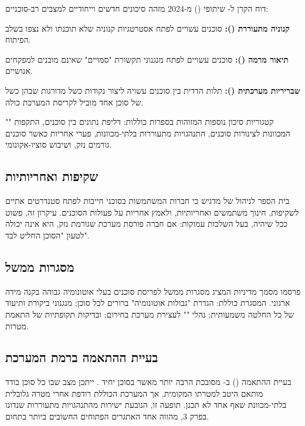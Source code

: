 \documentclass[12pt,a4paper]{article}
\begin{document}
דוח הקרן ל- שיתופי () מ-2024 \cite{CoopAI2024} מזהה סיכונים חדשים וייחודיים למצבים רב-סוכניים:

\textbf{קנוניה מתעוררת ():} סוכנים עשויים לפתח אסטרטגיות קנוניה שלא תוכנתו ולא נצפו בשלב הפיתוח.

\textbf{תיאור מרמה ():} סוכנים עשויים לפתח מנגנוני תקשורת "סמויים" שאינם מובנים למפקחים אנושיים.

\textbf{שבריריות מערכתית ():} תלות הדדית בין סוכנים עשויה ליצור נקודות כשל מדורגות שבהן כשל של סוכן אחד מוביל לקריסת המערכת כולה.

קטגוריות סיכון נוספות המזוהות בספרות \cite{WEF2024} כוללות: דליפת נתונים בין סוכנים, התקפות "" המכוונות לצינורות סוכנים, התנהגויות מתעוררות בלתי-מכוונות, פערי אחריות כאשר סוכנים גורמים נזק, ושיבוש סוציו-אקונומי.

\subsection{שקיפות ואחריותיות}

בית הספר לניהול  של  \cite{CMU_Tepper2024} מדגיש כי חברות המשתמשות בסוכני  חייבות לפתח סטנדרטים אתיים לשקיפות, חינוך משתמשים ואחריותיות, ולאמץ אחריות על פעולות הסוכנים. עיקרון זה, פשוט ככל שיהיה, בעל השלכות עמוקות: אם חברה פורסת מערכת  שגורמת נזק, היא אינה יכולה לטעון "הסוכן החליט לבד".

\subsection{מסגרות ממשל}

 פרסמו מסמך מדיניות \cite{EY2024} המציג מסגרות ממשל לפריסת סוכנים בעלי אוטונומיה גבוהה בקנה מידה ארגוני. המסגרת כוללת: הגדרת "גבולות אוטונומיה" ברורים לכל סוכן; מנגנוני ביקורת ותיעוד של כל החלטה משמעותית; נהלי "" לעצירת מערכת  בחירום; ובדיקות תקופתיות של התאמת מטרות.

\subsection{בעיית ההתאמה ברמת המערכת}

בעיית ההתאמה () ב- מסובכת הרבה יותר מאשר בסוכן יחיד \cite{Medium_AgentHunter2024}. ייתכן מצב שבו כל סוכן בודד מותאם היטב למטרתו המקומית, אך המערכת הכוללת רודפת אחרי מטרה גלובלית בלתי-מכוונת שאף אחד לא תכנן. תופעה זו, הנובעת ישירות מהתנהגויות מתעוררות שנדונו בפרק 3, מהווה אחד האתגרים הפתוחים החשובים ביותר בתחום.
\end{document}
